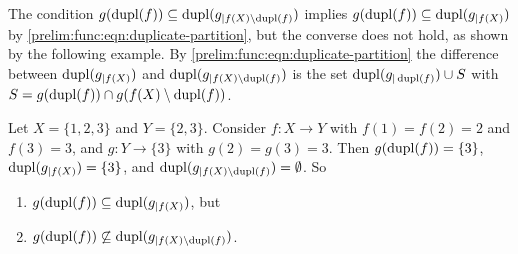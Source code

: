 The condition $g(\operatorname{dupl}(f)) \subseteq \operatorname{dupl}(g_{|f(X) \setminus \operatorname{dupl}(f)})$
implies $g(\operatorname{dupl}(f)) \subseteq \operatorname{dupl}(g_{|f(X)})$ by \cref{prelim:func:eqn:duplicate-partition}, 
but the converse does not hold, as shown by the following example.
By \cref{prelim:func:eqn:duplicate-partition} the difference between $\operatorname{dupl}(g_{|f(X)})$
and $\operatorname{dupl}(g_{|f(X) \setminus \operatorname{dupl}(f)})$ is the set
$\operatorname{dupl}(g_{|\operatorname{dupl}(f)}) \cup S$ with $S = g(\operatorname{dupl}(f)) \cap g(f(X) \setminus \operatorname{dupl}(f))$.

\begin{example}
	Let $X = \{1,2,3\}$ and $Y = \{2,3\}$. Consider $f \colon X \to Y$
	with $f(1) = f(2) = 2$ and $f(3) = 3$,
	and $g \colon Y \to \{3\}$
	with $g(2) = g(3) = 3$.
	Then $g(\operatorname{dupl}(f)) = \{3\}$, 
	$\operatorname{dupl}(g_{|f(X)}) = \{3\}$,
	and $\operatorname{dupl}(g_{|f(X) \setminus \operatorname{dupl}(f)}) = \emptyset$.
	So
	\begin{enumerate}
		\item $g(\operatorname{dupl}(f)) \subseteq \operatorname{dupl}(g_{|f(X)})$, but
		
		\item $g(\operatorname{dupl}(f)) \not\subseteq \operatorname{dupl}(g_{|f(X) \setminus \operatorname{dupl}(f)})$.
	\end{enumerate}
\end{example}

